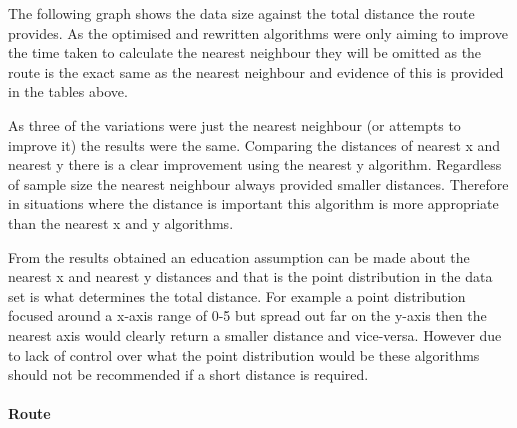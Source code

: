 \documentclass[conference,backref=page]{acmsiggraph}
\begin{document}
The following graph shows the data size against the total distance the route provides. As the optimised and rewritten algorithms were only aiming to improve the time taken to calculate the nearest neighbour they will be omitted as the route is the exact same as the nearest neighbour and evidence of this is provided in the tables above. 



As three of the variations were just the nearest neighbour (or attempts to improve it) the results were the same. Comparing the distances of nearest x and nearest y there is a clear improvement using the nearest y algorithm. Regardless of sample size the nearest neighbour always provided smaller distances. Therefore in situations where the distance is important this algorithm is more appropriate than the nearest x and y algorithms. 

From the results obtained an education assumption can be made about the nearest x and nearest y distances and that is the point distribution in the data set is what determines the total distance. For example a point distribution focused around a x-axis range of 0-5 but spread out far on the y-axis then the nearest axis would clearly return a smaller distance and vice-versa. However due to lack of control over what the point distribution would be these algorithms should not be recommended if a short distance is required. \paragraph{Route}\hfill
\end{document}
